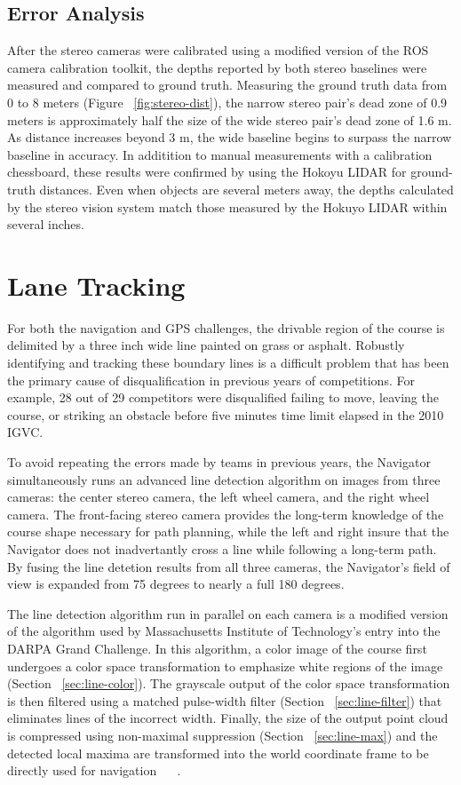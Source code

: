 \documentclass[twocolumn,11pt]{article}
\begin{document}
\subsection{Error Analysis}
\label{sec:stereo-error}
After the stereo cameras were calibrated using a modified version of the ROS
camera calibration toolkit, the depths reported by both stereo baselines were
measured and compared to ground truth. Measuring the ground truth data from 0
to 8 meters (Figure ~\ref{fig:stereo-dist}), the narrow stereo pair's dead
zone of 0.9 meters is approximately half the size of the wide stereo pair's
dead zone of 1.6 m. As distance increases beyond 3 m, the wide baseline begins
to surpass the narrow baseline in accuracy. In additition to manual measurements
with a calibration chessboard, these results were confirmed by using the Hokoyu
LIDAR for ground-truth distances. Even when objects are several meters away,
the depths calculated by the stereo vision system match those measured by
the Hokuyo LIDAR within several inches.

\section{Lane Tracking}
\label{sec:line}
For both the navigation and GPS challenges, the drivable region of the course
is delimited by a three inch wide line painted on grass or asphalt.
Robustly identifying and tracking these boundary lines is a
difficult problem that has been the primary cause of disqualification in
previous years of competitions. For example, 28 out of 29 competitors were
disqualified failing to move, leaving the course, or striking an obstacle
before five minutes time limit elapsed in the 2010 IGVC.

To avoid repeating the errors made by teams in previous years, the Navigator
simultaneously runs an advanced line detection algorithm on images from three
cameras: the center stereo camera, the left wheel camera, and the right wheel
camera. The front-facing stereo camera provides the long-term knowledge of the
course shape necessary for path planning, while the left and right insure that
the Navigator does not inadvertantly cross a line while following a long-term
path. By fusing the line detetion results from all three cameras, the
Navigator's field of view is expanded from 75 degrees to nearly a full 180
degrees.

The line detection algorithm run in parallel on each camera is a modified
version of the algorithm used by Massachusetts Institute of Technology's entry
into the DARPA Grand Challenge.  In this algorithm, a color image of the course
first undergoes a color space transformation to emphasize white regions of the
image (Section ~\ref{sec:line-color}). The grayscale output of the color space
transformation is then filtered using a matched pulse-width filter (Section
~\ref{sec:line-filter}) that eliminates lines of the incorrect width. Finally,
the size of the output point cloud is compressed using non-maximal suppression
(Section ~\ref{sec:line-max}) and the detected local maxima are transformed
into the world coordinate frame to be directly used for navigation
~\cite{huang_thesis} ~\cite{huang_paper}.
\end{document}
